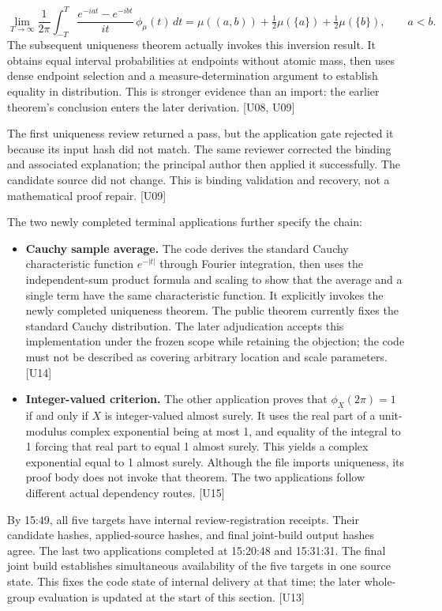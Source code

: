 \[
\lim_{T\to\infty}\frac{1}{2\pi}\int_{-T}^{T}
\frac{e^{-iat}-e^{-ibt}}{it}\,\phi_\mu(t)\,dt
=\mu((a,b))+\tfrac12\mu(\{a\})+\tfrac12\mu(\{b\}),\qquad a<b.
\]
The subsequent uniqueness theorem actually invokes this inversion result. It obtains equal interval probabilities at endpoints without atomic mass, then uses dense endpoint selection and a measure-determination argument to establish equality in distribution. This is stronger evidence than an import: the earlier theorem's conclusion enters the later derivation. [U08, U09]

The first uniqueness review returned a pass, but the application gate rejected it because its input hash did not match. The same reviewer corrected the binding and associated explanation; the principal author then applied it successfully. The candidate source did not change. This is binding validation and recovery, not a mathematical proof repair. [U09]

The two newly completed terminal applications further specify the chain:

\begin{itemize}[leftmargin=1.4em,itemsep=0.2em]
\item \textbf{Cauchy sample average.} The code derives the standard Cauchy characteristic function $e^{-|t|}$ through Fourier integration, then uses the independent-sum product formula and scaling to show that the average and a single term have the same characteristic function. It explicitly invokes the newly completed uniqueness theorem. The public theorem currently fixes the standard Cauchy distribution. The later adjudication accepts this implementation under the frozen scope while retaining the objection; the code must not be described as covering arbitrary location and scale parameters. [U14]
\item \textbf{Integer-valued criterion.} The other application proves that $\phi_X(2\pi)=1$ if and only if $X$ is integer-valued almost surely. It uses the real part of a unit-modulus complex exponential being at most 1, and equality of the integral to 1 forcing that real part to equal 1 almost surely. This yields a complex exponential equal to 1 almost surely. Although the file imports uniqueness, its proof body does not invoke that theorem. The two applications follow different actual dependency routes. [U15]
\end{itemize}
By 15:49, all five targets have internal review-registration receipts. Their candidate hashes, applied-source hashes, and final joint-build output hashes agree. The last two applications completed at 15:20:48 and 15:31:31. The final joint build establishes simultaneous availability of the five targets in one source state. This fixes the code state of internal delivery at that time; the later whole-group evaluation is updated at the start of this section. [U13]

